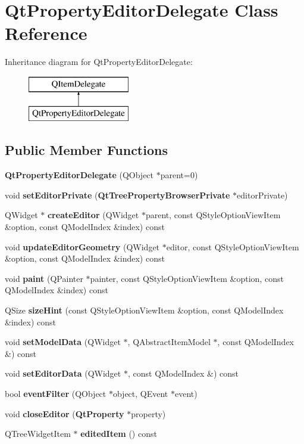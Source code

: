 \section{Qt\+Property\+Editor\+Delegate Class Reference}
\label{classQtPropertyEditorDelegate}
Inheritance diagram for Qt\+Property\+Editor\+Delegate\+:\begin{figure}[H]
\begin{center}
\leavevmode
\includegraphics[height=2.000000cm]{classQtPropertyEditorDelegate}
\end{center}
\end{figure}
\subsection*{Public Member Functions}
\begin{DoxyCompactItemize}
\item 
{\bf Qt\+Property\+Editor\+Delegate} (Q\+Object $\ast$parent=0)
\item 
void {\bf set\+Editor\+Private} ({\bf Qt\+Tree\+Property\+Browser\+Private} $\ast$editor\+Private)
\item 
Q\+Widget $\ast$ {\bf create\+Editor} (Q\+Widget $\ast$parent, const Q\+Style\+Option\+View\+Item \&option, const Q\+Model\+Index \&index) const 
\item 
void {\bf update\+Editor\+Geometry} (Q\+Widget $\ast$editor, const Q\+Style\+Option\+View\+Item \&option, const Q\+Model\+Index \&index) const 
\item 
void {\bf paint} (Q\+Painter $\ast$painter, const Q\+Style\+Option\+View\+Item \&option, const Q\+Model\+Index \&index) const 
\item 
Q\+Size {\bf size\+Hint} (const Q\+Style\+Option\+View\+Item \&option, const Q\+Model\+Index \&index) const 
\item 
void {\bf set\+Model\+Data} (Q\+Widget $\ast$, Q\+Abstract\+Item\+Model $\ast$, const Q\+Model\+Index \&) const 
\item 
void {\bf set\+Editor\+Data} (Q\+Widget $\ast$, const Q\+Model\+Index \&) const 
\item 
bool {\bf event\+Filter} (Q\+Object $\ast$object, Q\+Event $\ast$event)
\item 
void {\bf close\+Editor} ({\bf Qt\+Property} $\ast$property)
\item 
Q\+Tree\+Widget\+Item $\ast$ {\bf edited\+Item} () const 
\end{DoxyCompactItemize}
